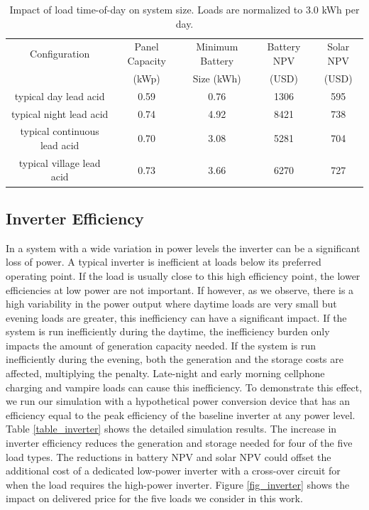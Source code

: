 \documentclass[conference]{IEEEtran}
\begin{document}
\begin{table}
\centering
\begin{tabular}{c c c c c}
Configuration & Panel Capacity & Minimum Battery & Battery NPV & Solar NPV \\
              & (kWp)          & Size (kWh)      & (USD)       & (USD)     \\
\hline
typical day lead acid        & 0.59 & 0.76 & 1306 & 595 \\
typical night lead acid      & 0.74 & 4.92 & 8421 & 738 \\
typical continuous lead acid & 0.70 & 3.08 & 5281 & 704 \\
typical village lead acid    & 0.73 & 3.66 & 6270 & 727 \\
\end{tabular}
\caption{Impact of load time-of-day on system size.
Loads are normalized to 3.0 kWh per day.}
\label{tbl_baseline}
\end{table}

\subsection{Inverter Efficiency}

In a system with a wide variation in power levels the inverter can
be a significant loss of power.
A typical inverter is inefficient at loads below its
preferred operating point.
If the load is usually close to this high efficiency
point, the lower efficiencies at low power are not important.
If however, as we observe, there is a high variability
in the power output where daytime loads are very small
but evening loads are greater, this inefficiency can have
a significant impact.
If the system is run inefficiently during the daytime, the inefficiency
burden only impacts the amount of generation capacity needed.
If the system is run inefficiently during the evening, both the
generation and the storage costs are affected, multiplying the
penalty.
Late-night and early morning cellphone charging and vampire
loads can cause this inefficiency.
To demonstrate this effect, we run our simulation with
a hypothetical power conversion device that has an
efficiency equal to the peak efficiency of the baseline
inverter at any power level.
Table \ref{table_inverter} shows the detailed simulation
results.
The increase in inverter efficiency reduces the generation
and storage needed for four of the five load types.
The reductions in battery NPV and solar NPV could offset the
additional cost of a dedicated low-power inverter with a
cross-over circuit for when the load requires the high-power inverter.
Figure \ref{fig_inverter}
shows the impact on delivered price for the five loads we
consider in this work.
\end{document}
